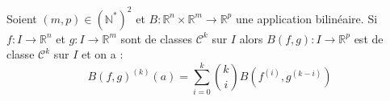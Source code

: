 \documentclass[a4paper,10pt]{report}
\begin{document}
\begin{thm}
Soient $(m,p) \in (\mathbb{N}^*)^2$ et $B : \mathbb{R}^n \times \mathbb{R}^m \rightarrow \mathbb{R}^p$ une application bilinéaire.  Si $f : I \rightarrow \mathbb{R}^n$ et $g : I \rightarrow \mathbb{R}^m$ sont de classes $\mathcal{C}^k$ sur $I$ alors $B(f,g):  I \rightarrow \mathbb{R}^p$ est de classe $\mathcal{C}^k$ sur $I$ et on a :
$$ B(f,g)^{(k)}(a)=  \sum_{i=0}^{k} \binom{k}{i} B(f^{(i)},g^{(k-i)})$$
\end{thm}
\end{document}
